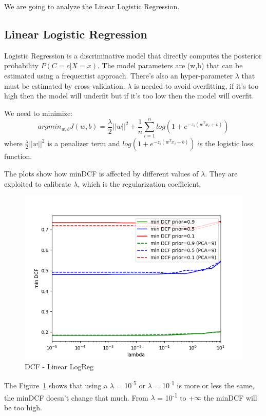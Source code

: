\documentclass[english]{report}
\begin{document}
We are going to analyze the Linear Logistic Regression.
\subsection{Linear Logistic Regression}

Logistic Regression is a discriminative model that directly computes the posterior probability \(P(C=c|X=x)\).
The model parameters are (w,b) that can be estimated using a frequentist approach.
There's also an hyper-parameter $\lambda$ that must be estimated by cross-validation. $\lambda$ is needed to avoid overfitting, if it's too high then the model will
underfit but if it's too low then the model will overfit.\newline

We need to minimize:
\[argmin_{w,b} J(w,b) = \frac{\lambda}{2}||w||^2 + \frac{1}{n}\sum_{i=1}^{n}log(1+e^{-z_i(w^Tx_i+b)})\]
where \(\frac{\lambda}{2}||w||^2\) is a penalizer term and \(log(1+e^{-z_i(w^Tx_i+b)})\) is the logistic
loss function. \newline

The plots show how minDCF is affected by different values of $\lambda$.
They are exploited to calibrate $\lambda$, which is the regularization coefficient.

\begin{figure}[H]
    \centering
    \includegraphics[scale=0.5]{../../images/validation/LR_PCA_minDCF_comparison}
    \caption{DCF - Linear LogReg}
    \label{fig:DCF_LinearLogReg_valid}
\end{figure}

The Figure~\ref{fig:DCF_LinearLogReg_valid} shows that using a $\lambda$ = 10\textsuperscript{-5} or $\lambda$ = 10\textsuperscript{-1}
is more or less the same, the minDCF doesn't change that much.
From $\lambda$ = 10\textsuperscript{-1} to +$\infty$ the minDCF will be too high.
\end{document}
